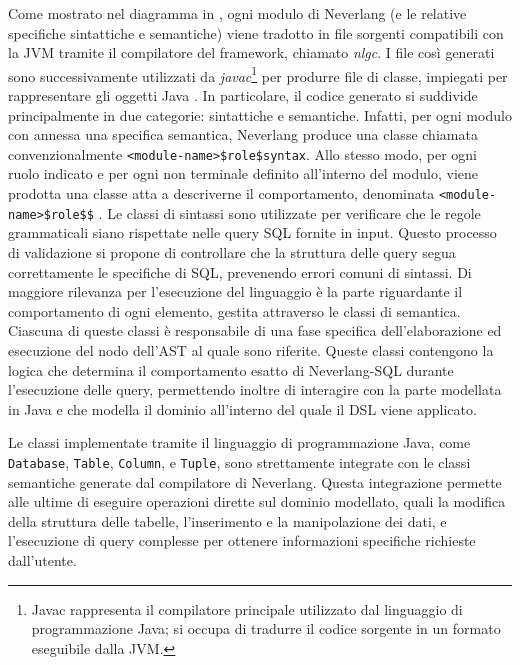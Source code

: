 \documentclass[12pt,a4paper,openright,twoside]{book}
\begin{document}
Come mostrato nel diagramma in , ogni modulo di Neverlang (e le relative specifiche sintattiche e semantiche) 
viene tradotto in file sorgenti compatibili con la \ac{JVM} tramite il compilatore del framework, chiamato \textit{nlgc}. I file così 
generati sono successivamente utilizzati da \textit{javac}\footnote{Javac rappresenta il compilatore principale utilizzato dal 
linguaggio di programmazione Java; si occupa di tradurre il codice sorgente in un formato eseguibile dalla JVM.} per produrre file 
di classe, impiegati per rappresentare gli oggetti Java \cite[p. 19]{Vacchi2015}. In particolare, il codice generato si suddivide 
principalmente in due categorie: sintattiche e semantiche. Infatti, per ogni modulo con annessa una specifica semantica, Neverlang 
produce una classe chiamata convenzionalmente \texttt{<module-name>\$role\$syntax}. Allo stesso modo, per ogni ruolo indicato e per 
ogni non terminale definito all'interno del modulo, viene prodotta una classe atta a descriverne il comportamento, denominata 
\texttt{<module-name>\$role\$<role-name>\$<node-number>} \cite[pp. 21-22]{Vacchi2015}. Le classi di sintassi sono utilizzate per 
verificare che le regole grammaticali siano rispettate nelle query \ac{SQL} fornite in input. Questo processo di validazione si 
propone di controllare che la struttura delle query segua correttamente le specifiche di \ac{SQL}, prevenendo errori comuni di 
sintassi. Di maggiore rilevanza per l’esecuzione del linguaggio è la parte riguardante il comportamento di ogni elemento, gestita 
attraverso le classi di semantica. Ciascuna di queste classi è responsabile di una fase specifica dell’elaborazione ed esecuzione del 
nodo dell’\ac{AST} al quale sono riferite. Queste classi contengono la logica che determina il comportamento esatto di Neverlang-SQL 
durante l’esecuzione delle query, permettendo inoltre di interagire con la parte modellata in Java e che modella il dominio 
all'interno del quale il DSL viene applicato.

Le classi implementate tramite il linguaggio di programmazione Java, come \texttt{Database}, \texttt{Table}, \texttt{Column}, e \texttt{Tuple}, sono strettamente 
integrate con le classi semantiche generate dal compilatore di Neverlang. Questa integrazione permette alle ultime di eseguire 
operazioni dirette sul dominio modellato, quali la modifica della struttura delle tabelle, l’inserimento e la manipolazione dei dati, 
e l’esecuzione di query complesse per ottenere informazioni specifiche richieste dall’utente.
\end{document}
